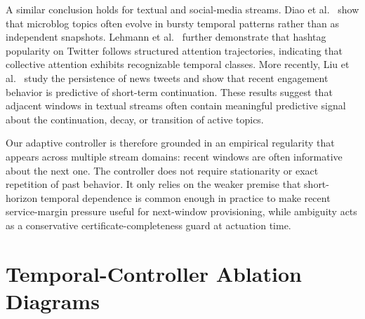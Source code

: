 \documentclass[sigconf, nonacm]{acmart}
\begin{document}
A similar conclusion holds for textual and social-media streams. Diao et al.~\cite{diao2012bursty} show that microblog topics often evolve in bursty temporal patterns rather than as independent snapshots. Lehmann et al.~\cite{lehmann2012dynamical} further demonstrate that hashtag popularity on Twitter follows structured attention trajectories, indicating that collective attention exhibits recognizable temporal classes. More recently, Liu et al.~\cite{liu2023analyzing} study the persistence of news tweets and show that recent engagement behavior is predictive of short-term continuation. These results suggest that adjacent windows in textual streams often contain meaningful predictive signal about the continuation, decay, or transition of active topics.

Our adaptive controller is therefore grounded in an empirical regularity that appears across multiple stream domains: recent windows are often informative about the next one. The controller does not require stationarity or exact repetition of past behavior. It only relies on the weaker premise that short-horizon temporal dependence is common enough in practice to make recent service-margin pressure useful for next-window provisioning, while ambiguity acts as a conservative certificate-completeness guard at actuation time.


\appendix

\section{Temporal-Controller Ablation Diagrams}
\label{app:controller-ablation-diagrams}
\end{document}
